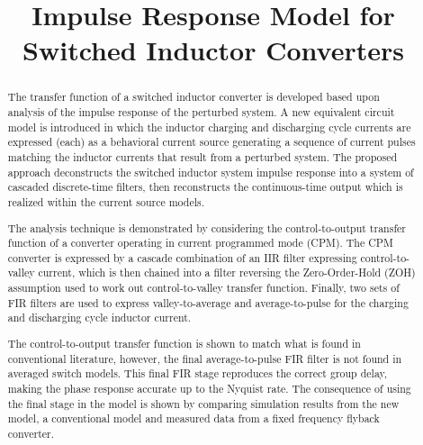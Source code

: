 \documentclass[conference]{IEEEtran}
\begin{document}
\title{Impulse Response Model for Switched Inductor Converters\\}

\author{
\and
{}
}


\maketitle

\begin{abstract}
The transfer function of a switched inductor converter is developed based upon analysis of the impulse response of the perturbed system. A new equivalent circuit model is introduced in which the inductor charging and discharging cycle currents are expressed (each) as a behavioral current source generating a sequence of current pulses matching the inductor currents that result from a perturbed system. The proposed approach deconstructs the switched inductor system impulse response into a system of cascaded discrete-time filters, then reconstructs the continuous-time output which is realized within the current source models.  

The analysis technique is demonstrated by considering the control-to-output transfer function of a converter operating in current programmed mode (CPM). The CPM converter is expressed by a cascade combination of an IIR filter expressing control-to-valley current, which is then chained into a filter reversing the Zero-Order-Hold (ZOH) assumption used to work out control-to-valley transfer function.  Finally, two sets of FIR filters are used to express valley-to-average and average-to-pulse for the charging and discharging cycle inductor current.  

The control-to-output transfer function is shown to match what is found in conventional literature, however, the final average-to-pulse FIR filter is not found in averaged switch models.  This final FIR stage reproduces the correct group delay, making the phase response accurate up to the Nyquist rate.  The consequence of using the final stage in the model is shown by comparing simulation results from the new model, a conventional model and measured data from a fixed frequency flyback converter.

\end{abstract}
\end{document}
